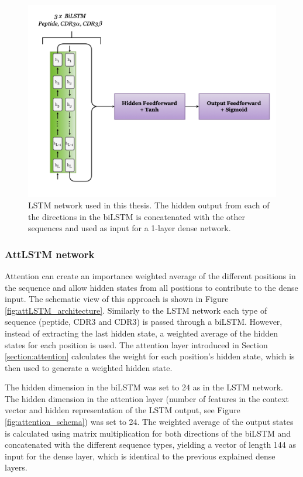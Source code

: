 \begin{figure}[H]
    \centering
    \includegraphics[width=\linewidth]{figures/lstm_architecture.png}
    \caption{LSTM network used in this thesis. The hidden output from each of the directions in the biLSTM is concatenated with the other sequences and used as input for a 1-layer dense network.}
    \label{fig:lstm_architecture}
\end{figure}

\subsubsection{AttLSTM network}
Attention can create an importance weighted average of the different positions in the sequence and allow hidden states from all positions to contribute to the dense input. The schematic view of this approach is shown in Figure \ref{fig:attLSTM_architecture}. Similarly to the LSTM network each type of sequence (peptide, CDR3{\textalpha} and CDR3{\textbeta}) is passed through a biLSTM. However, instead of extracting the last hidden state, a weighted average of the hidden states for each position is used. The attention layer introduced in Section \ref{section:attention} calculates the weight for each position's hidden state, which is then used to generate a weighted hidden state. 

The hidden dimension in the biLSTM was set to 24 as in the LSTM network. The hidden dimension in the attention layer (number of features in the context vector and hidden representation of the LSTM output, see Figure \ref{fig:attention_schema}) was set to 24. The weighted average of the output states is calculated using matrix multiplication for both directions of the biLSTM and concatenated with the different sequence types, yielding a vector of length 144 as input for the dense layer, which is identical to the previous explained dense layers.

